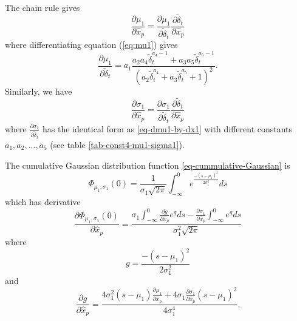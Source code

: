\documentclass[extra]{gji}
\begin{document}
The chain rule gives
\begin{equation}
\frac{\partial \mu_1}{\partial \hat{x}_p} = \frac{\partial \mu_1}{\partial \widetilde{\delta}_t} \frac{\partial \widetilde{\delta}_t}{\partial \hat{x}_p}
\end{equation}
where differentiating equation (\ref{eq:mu1}) gives
\begin{equation}
\label{eq-dmu1-by-dx1}
\frac{\partial \mu_1}{\partial \widetilde{\delta}_t} = a_1 \frac{a_2 a_4 \widetilde{\delta}_t^{a_4-1} +a_3 a_5 \widetilde{\delta}_t^{a_5-1}}
{\left(a_2 \widetilde{\delta}_t^{a_4} +a_3 \widetilde{\delta}_t^{a_5} +1 \right)^2}.
\end{equation}
Similarly, we have
\begin{equation}
\frac{\partial \sigma_1}{\partial \hat{x}_p} = \frac{\partial \sigma_1}{\partial \widetilde{\delta}_t} \frac{\partial \widetilde{\delta}_t}
{\partial \hat{x}_p}
\end{equation}
where $\frac{\partial \sigma_1}{\partial \widetilde{\delta}_t}$ has the identical form as \ref{eq-dmu1-by-dx1} with different constants
$a_1,a_2,...,a_5$ (see table \ref{tab-const4-mu1-sigma1}).

The cumulative Gaussian distribution function \ref{eq-cummulative-Gaussian} is
\begin{equation}
\Phi_{\mu_1,\sigma_1}(0) = \frac{1}{\sigma_1 \sqrt{2 \pi}}
\int_{-\infty}^0 e^{  \frac{-(s-\mu_1)^2}{2\sigma_1^2}  } ds
\end{equation}
which has derivative
\begin{equation}
\frac{\partial \Phi_{\mu_1,\sigma_1}(0)}{\partial \hat{x}_p} =
\frac{ \sigma_1 \int_{-\infty}^0 \frac{\partial g}{\partial \hat{x}_p} e^g ds -
\frac{\partial \sigma_1}{\partial \hat{x}_p} \int_{-\infty}^0 e^g ds}
{\sigma_1^2 \sqrt{2 \pi}}
\end{equation}
where
\begin{equation}
g = \frac{-(s-\mu_1)^2}{2 \sigma_1^2}
\end{equation}
and
\begin{equation}
\frac{\partial g}{\partial \hat{x}_p} = \frac{4 \sigma_1^2 (s-\mu_1) \frac{\partial \mu_1}{\partial \hat{x}_p}
+ 4\sigma_1 \frac{\partial \sigma_1}{\partial \hat{x}_p}(s-\mu_1)^2}
{4 \sigma_1^4}.
\end{equation}
\end{document}
